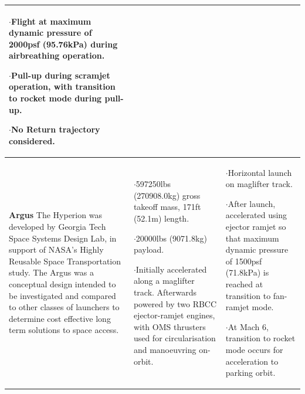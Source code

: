{\begin{landscape}
\begin{xltabular}{\linewidth}{|X|X|X|}
$\cdot$Flight at maximum dynamic pressure of 2000psf (95.76kPa) during airbreathing operation. 

$\cdot$Pull-up during scramjet operation, with transition to rocket mode during pull-up. 

$\cdot$No Return trajectory considered.

\\
\hline \small\textbf{Argus}\cite{Argus} \newline\newline
The Hyperion was developed by Georgia Tech Space Systems Design Lab, in support of NASA's Highly Reusable Space Transportation study. The Argus was a conceptual design intended to be investigated and compared to other classes of launchers to determine cost effective long term solutions to space access.  
&\small
{}

$\cdot$597250lbs (270908.0kg) gross takeoff mass, 171ft (52.1m) length. 

$\cdot$20000lbs (9071.8kg) payload.

$\cdot$Initially accelerated along a maglifter track. Afterwards powered by two RBCC ejector-ramjet engines, with OMS thrusters used for circularisation and manoeuvring on-orbit. 

&\small
$\cdot$Horizontal launch on maglifter track. 

$\cdot$After launch, accelerated using ejector ramjet so that maximum dynamic pressure of 1500psf (71.8kPa) is reached at transition to fan-ramjet mode. 

$\cdot$At Mach 6, transition to rocket mode occurs for acceleration to parking orbit.\\ 

\hline 
\end{xltabular} 
	\end{landscape}
}

